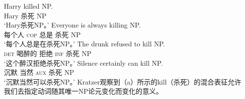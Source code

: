 \eal
\ex 
\gll Harry killed NP.\\
     Hary 杀死 NP\\
\glt `Hary杀死NP。'
\ex 
\gll Everyone is always killing NP.\\
     每个人 \textsc{cop} 总是 杀死 NP\\
\glt `每个人总是在杀死NP。'
\ex 
\gll The drunk refused to kill NP.\\
     \textsc{det} 喝醉的 拒绝 \textsc{inf} 杀死 NP\\
\glt `这个醉汉拒绝杀死NP。'
\ex 
\gll Silence certainly can kill NP.\\
     沉默 当然 \textsc{aux} 杀死 NP\\
\glt `沉默当然可以杀死NP。'
\zl
Kratzer观察到（a）所示的kill（杀死）的混合表征允许我们去指定动词随其唯一NP论元变化而变化的意义。

